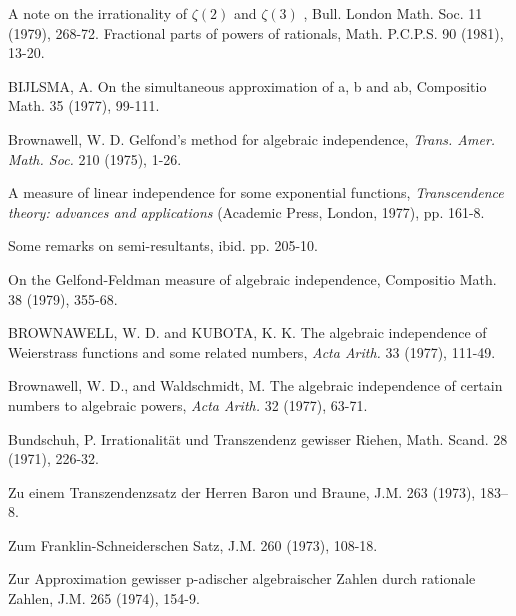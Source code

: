 \begin{hanglist}
    \item \hspace{1.5em} A note on the irrationality of  $\zeta(2)$  and  $\zeta(3)$ , Bull. London Math. Soc. 11 (1979), 268-72. Fractional parts of powers of rationals, Math. P.C.P.S. 90 (1981), 13-20.
    \item BIJLSMA, A. On the simultaneous approximation of a, b and ab, Compositio Math. 35 (1977), 99-111.
    \item Brownawell, W. D. Gelfond's method for algebraic independence, \textit{Trans. Amer. Math. Soc.} 210 (1975), 1-26.
    \item \hspace{1.5em} A measure of linear independence for some exponential functions, \textit{Transcendence theory: advances and applications} (Academic Press, London, 1977), pp. 161-8.
    \item \hspace{1.5em} Some remarks on semi-resultants, ibid. pp. 205-10.
    \item \hspace{1.5em} On the Gelfond-Feldman measure of algebraic independence, Compositio Math. 38 (1979), 355-68.
    \item BROWNAWELL, W. D. and KUBOTA, K. K. The algebraic independence of Weierstrass functions and some related numbers, \textit{Acta Arith.} 33 (1977), 111-49.
    \item Brownawell, W. D., and Waldschmidt, M. The algebraic independence of certain numbers to algebraic powers, \textit{Acta Arith.} 32 (1977), 63-71.
    \item Bundschuh, P. Irrationalität und Transzendenz gewisser Riehen, Math. Scand. 28 (1971), 226-32.
    \item \hspace{1.5em} Zu einem Transzendenzsatz der Herren Baron und Braune, J.M. 263 (1973), 183–8.
    \item \hspace{1.5em} Zum Franklin-Schneiderschen Satz, J.M. 260 (1973), 108-18.
    \item \hspace{1.5em} Zur Approximation gewisser p-adischer algebraischer Zahlen durch rationale Zahlen, J.M. 265 (1974), 154-9.

\end{hanglist}

